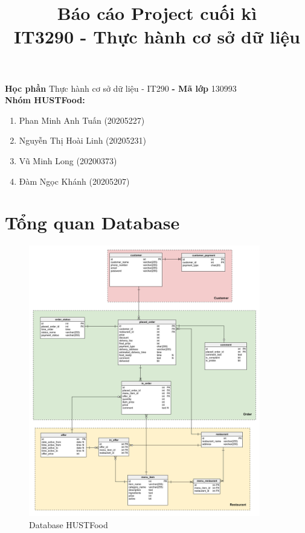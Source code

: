 \documentclass[a4paper,12pt]{article}
\title{\textbf{Báo cáo Project cuối kì \\ IT3290 - Thực hành cơ sở dữ liệu}}
\author{}
\date{}
\begin{document}
\maketitle
\noindent
\textbf{Học phần} Thực hành cơ sở dữ liệu - IT290 \textbf{- Mã lớp} 130993\\
\textbf{Nhóm HUSTFood:}
\begin{enumerate}
	\item Phan Minh Anh Tuấn (20205227)
	\item Nguyễn Thị Hoài Linh (20205231)
	\item Vũ Minh Long (20200373)
	\item Đàm Ngọc Khánh (20205207)
\end{enumerate}\large
\newpage
\tableofcontents
\newpage
\section{Tổng quan Database}
\begin{figure}[ht!]
	\centerline{\includegraphics[width=0.9\textwidth]{sql.png}}
	\label{fig:ass1}
	\caption{Database HUSTFood}
\end{figure}
\clearpage
\end{document}
